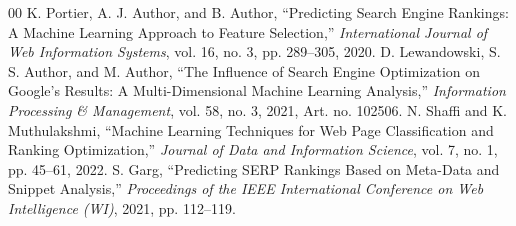 \documentclass[conference]{IEEEtran}
\begin{document}
\begin{thebibliography}{00}
 K. Portier, A. J. Author, and B. Author, ``Predicting Search Engine Rankings: A Machine Learning Approach to Feature Selection,'' \textit{International Journal of Web Information Systems}, vol. 16, no. 3, pp. 289--305, 2020.
 D. Lewandowski, S. S. Author, and M. Author, ``The Influence of Search Engine Optimization on Google's Results: A Multi-Dimensional Machine Learning Analysis,'' \textit{Information Processing \& Management}, vol. 58, no. 3, 2021, Art. no. 102506.
 N. Shaffi and K. Muthulakshmi, ``Machine Learning Techniques for Web Page Classification and Ranking Optimization,'' \textit{Journal of Data and Information Science}, vol. 7, no. 1, pp. 45--61, 2022.
 S. Garg, ``Predicting SERP Rankings Based on Meta-Data and Snippet Analysis,'' \textit{Proceedings of the IEEE International Conference on Web Intelligence (WI)}, 2021, pp. 112--119.
\end{thebibliography}
\end{document}
